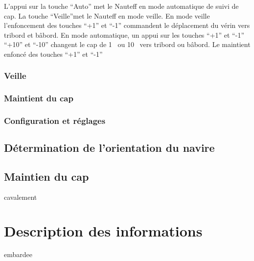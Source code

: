 \documentclass[a4paper,11pt]{report}
\begin{document}
L'appui sur la touche ``Auto'' met le Nauteff en mode automatique de suivi de cap.
La touche ``Veille''met le Nauteff en mode veille.
En mode veille l'enfoncement des touches ``+1'' et ``-1'' commandent le déplacement du vérin vers tribord et bâbord.
En mode automatique, un appui sur les touches ``+1'' et ``-1'' ``+10'' et ``-10''
changent le cap de 1\degres~ ou 10\degres~ vers tribord ou bâbord.
Le maintient enfoncé des touches ``+1'' et ``-1''

\subsection{Veille}


\subsection{Maintient du cap}

\subsection{Configuration et réglages}

\section{Détermination de l'orientation du navire}

\section{Maintien du cap}
\gls{cavalement}
\chapter{Description des informations}
\gls{embardee}
\end{document}
